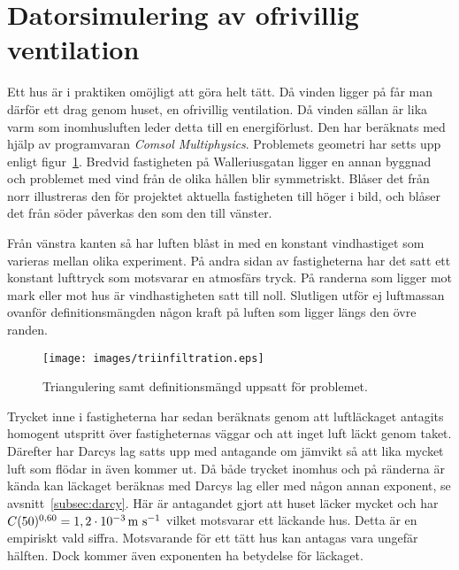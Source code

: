 \section{Datorsimulering av ofrivillig ventilation}

Ett hus är i praktiken omöjligt att göra helt tätt. Då vinden ligger på
får man därför ett drag genom huset, en ofrivillig ventilation. Då vinden
sällan är lika varm som inomhusluften leder detta till en energiförlust.
Den har beräknats med hjälp av programvaran \emph{Comsol Multiphysics}. Problemets geometri har
setts upp enligt figur~\ref{fig:windmethod:tri}. Bredvid fastigheten på Walleriusgatan ligger en annan byggnad och problemet med vind från de olika hållen blir symmetriskt. Blåser det från norr illustreras den för projektet aktuella fastigheten till höger i bild, och blåser det från söder påverkas den som den till vänster.

Från vänstra kanten så har luften blåst in med en konstant vindhastiget som varieras mellan olika
experiment. På andra sidan av fastigheterna har det satt ett konstant lufttryck som motsvarar en
atmosfärs tryck. På randerna som ligger mot mark eller mot hus är vindhastigheten satt till noll.
Slutligen utför ej luftmassan ovanför definitionsmängden någon kraft på luften som ligger längs den
övre randen.

\begin{figure}
\centering
\texttt{[image: images/triinfiltration.eps]}
\caption{Triangulering samt definitionsmängd uppsatt för problemet.}\label{fig:windmethod:tri}
\end{figure}

Trycket inne i fastigheterna har sedan beräknats genom att luftläckaget antagits homogent utspritt över fastigheternas
väggar och att inget luft läckt genom taket. Därefter har Darcys lag satts upp med antagande om jämvikt så att lika mycket
luft som flödar in även kommer ut. Då både trycket inomhus och på ränderna är kända kan läckaget beräknas med Darcys lag
eller med någon annan exponent, se avsnitt~\ref{subsec:darcy}. Här är antagandet gjort att huset läcker mycket och har $C(50)^{0,60} = \unit[1,2\cdot 10^{-3}]{m~s^{-1}}$ vilket motsvarar ett läckande hus. Detta
är en empiriskt vald siffra. Motsvarande för ett tätt hus kan antagas vara ungefär hälften.
Dock kommer även exponenten ha betydelse för läckaget.\cite{sasic}
